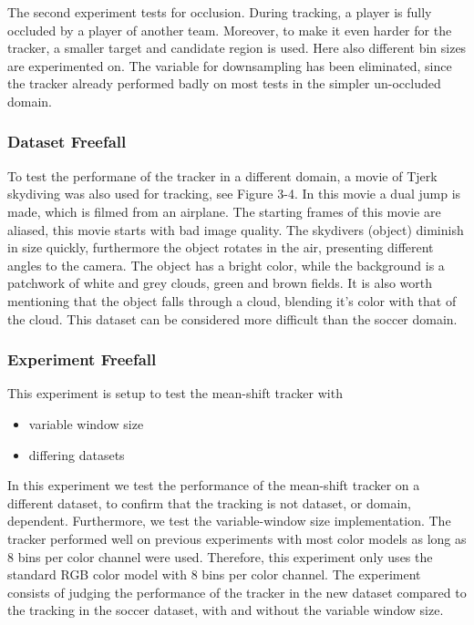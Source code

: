 \documentclass[a4paper,11pt]{article}
\begin{document}
The second experiment tests for occlusion. During tracking, a player is fully
occluded by a player of another team. Moreover, to make it even harder for the
tracker, a smaller target and candidate region is used. Here also different bin sizes are experimented on.
The variable for downsampling has been eliminated, since the tracker already performed badly on most tests in the simpler un-occluded domain.

\subsubsection{Dataset Freefall}
To test the performane of the tracker in a different domain, a movie of Tjerk
skydiving was also used for tracking, see Figure 3-4. In this movie a dual jump is made, which is
filmed from an airplane. The starting frames of this movie are aliased, this movie starts with bad image quality.
The skydivers (object) diminish in size quickly, furthermore the object rotates in the air, presenting different angles to the camera. The object has a bright color, while the background is a patchwork of white and grey clouds, green and brown fields. It is also worth mentioning that the object falls through a cloud, blending it's color with that of the cloud.
This dataset can be considered more difficult than the soccer domain.
 

\subsubsection{Experiment Freefall}
This experiment is setup to test the mean-shift tracker with 
\begin{itemize}
\item variable window size
\item differing datasets
\end{itemize}

In this experiment we test the performance of the mean-shift tracker on a different dataset, to confirm that the tracking is not dataset, or domain, dependent. Furthermore, we test the variable-window size implementation. 
The tracker performed well on previous experiments with most color models as long as 8 bins per
color channel were used. Therefore, this experiment only uses the standard RGB color model with 8 bins per color channel.
The experiment consists of judging the performance of the tracker in the new dataset compared to the tracking in the soccer dataset, with and without the variable window size.
\end{document}

